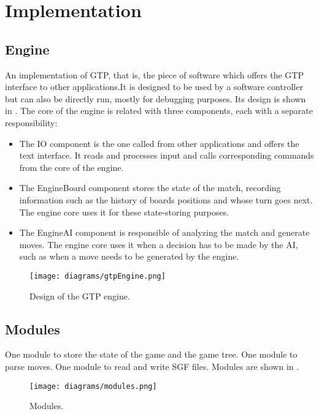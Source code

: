 \section{Implementation}

\subsection{Engine}

An implementation of GTP, that is, the piece of software which offers the GTP
interface to other applications.\@ It is designed to be used by a software controller
but can also be directly run, mostly for debugging purposes. Its design is shown
in . The core of the engine is related with three components,
each with a separate responsibility:

\begin{itemize}
	\item The IO component is the one called from other applications and offers
		the text interface. It reads and processes input and calls corresponding
		commands from the core of the engine.
	\item The EngineBoard component stores the state of the match, recording
		information such as the history of boards positions and whose turn goes
		next. The engine core uses it for these state-storing purposes.
	\item The EngineAI component is responsible of analyzing the match and
		generate moves. The engine core uses it when a decision has to be made
		by the AI, such as when a move needs to be generated by the engine.
\end{itemize}

\begin{figure}[h]
	\begin{center}
		\texttt{[image: diagrams/gtpEngine.png]}
		\caption{Design of the GTP engine.}\label{fig:engine}
	\end{center}
\end{figure}

\subsection{Modules}

One module to store the state of the game and the game tree. One module to parse
moves. One module to read and write SGF files. Modules are shown in
.

\begin{figure}[h]
	\begin{center}
		\texttt{[image: diagrams/modules.png]}
		\caption{Modules.}\label{fig:modules}
	\end{center}
\end{figure}

